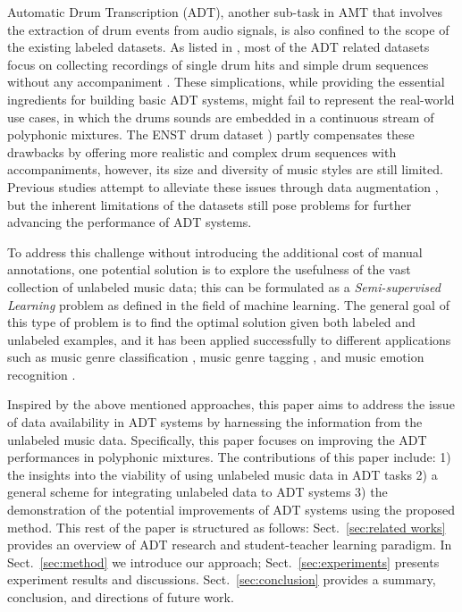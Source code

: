 \documentclass{article}
\begin{document}
Automatic Drum Transcription (ADT), another sub-task in AMT that involves the extraction of drum events from audio signals, is also confined to the scope of the existing labeled datasets. As listed in \cite{Wu2016}, most of the ADT related datasets focus on collecting recordings of single drum hits \cite{Tindale2004, Prockup2013} and simple drum sequences without any accompaniment \cite{Dittmar2014}. These simplications, while providing the essential ingredients for building basic ADT systems, might fail to represent the real-world use cases, in which the drums sounds are embedded in a continuous stream of polyphonic mixtures. The ENST drum dataset \cite{Gillet2006}) partly compensates these drawbacks by offering more realistic and complex drum sequences with accompaniments, however, its size and diversity of music styles are still limited. Previous studies attempt to alleviate these issues through data augmentation \cite{Wu2016, Vogl2017}, but the inherent limitations of the datasets still pose problems for further advancing the performance of ADT systems. 

To address this challenge without introducing the additional cost of manual annotations, one potential solution is to explore the usefulness of the vast collection of unlabeled music data; this can be formulated as a \textit{Semi-supervised Learning} \cite{Chapelle2006} problem as defined in the field of machine learning. The general goal of this type of problem is to find the optimal solution given both labeled and unlabeled examples, and it has been applied successfully to different applications such as music genre classification \cite{Raina2007a}, music genre tagging \cite{Jao2015}, and music emotion recognition \cite{Wu2013a}.

Inspired by the above mentioned approaches, this paper aims to address the issue of data availability in ADT systems by harnessing the information from the unlabeled music data. Specifically, this paper focuses on improving the ADT performances in polyphonic mixtures. The contributions of this paper include: 1) the insights into the viability of using unlabeled music data in ADT tasks 2) a general scheme for integrating unlabeled data to ADT systems 3) the demonstration of the potential improvements of ADT systems using the proposed method. This rest of the paper is structured as follows: Sect.~\ref{sec:related works} provides an overview of ADT research and student-teacher learning paradigm. In Sect.~\ref{sec:method} we introduce our approach; Sect.~\ref{sec:experiments} presents experiment results and discussions. Sect.~\ref{sec:conclusion} provides a summary, conclusion, and directions of future work.
\end{document}
